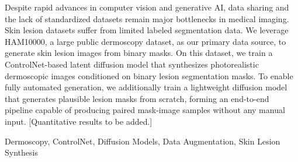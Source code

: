 \begin{boxedabstract}
Despite rapid advances in computer vision and generative AI, data sharing and the lack of standardized datasets remain major bottlenecks in medical imaging. Skin lesion datasets suffer from limited labeled segmentation data. We leverage HAM10000, a large public dermoscopy dataset, as our primary data source, to generate skin lesion images from binary masks. On this dataset, we train a ControlNet-based latent diffusion model that synthesizes photorealistic dermoscopic images conditioned on binary lesion segmentation masks. To enable fully automated generation, we additionally train a lightweight diffusion model that generates plausible lesion masks from scratch, forming an end-to-end pipeline capable of producing paired mask-image samples without any manual input. [Quantitative results to be added.]
\end{boxedabstract}

\begin{keywordsblock}
Dermoscopy, ControlNet, Diffusion Models, Data Augmentation, Skin Lesion Synthesis
\end{keywordsblock}

\vspace{2mm}
